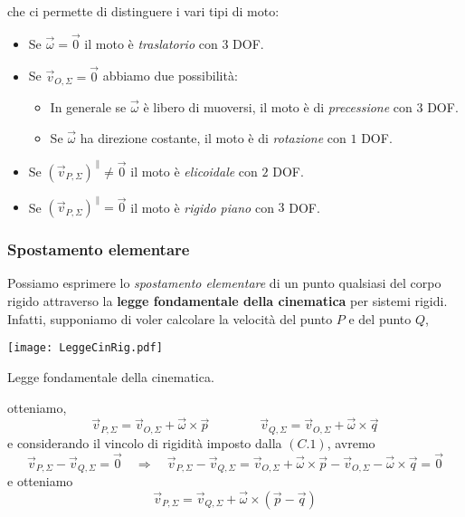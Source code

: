 che ci permette di distinguere i vari tipi di moto:
\begin{itemize}
	\item Se $\vec{\omega} = \vec{0}$ il moto è \emph{traslatorio} con $3$ DOF.
	\item Se $\vec{v}_{O,\Sigma} = \vec{0}$ abbiamo due possibilità:
	\begin{itemize}
		\item In generale se $\vec{\omega}$ è libero di muoversi, il moto è di \emph{precessione} con $3$ DOF.
		\item Se $\vec{\omega}$ ha direzione costante, il moto è di \emph{rotazione} con $1$ DOF.
	\end{itemize}		
	\item Se $(\vec{v}_{P,\Sigma})^{\,\parallel} \neq \vec{0}$ il moto è \emph{elicoidale} con $2$ DOF.
	\item Se $(\vec{v}_{P,\Sigma})^{\,\parallel} = \vec{0}$ il moto è \emph{rigido piano} con $3$ DOF.
\end{itemize}

\subsubsection{Spostamento elementare}
Possiamo esprimere lo \emph{spostamento elementare} di un punto qualsiasi del corpo rigido attraverso la \textbf{legge fondamentale della cinematica} per sistemi rigidi. Infatti, supponiamo di voler calcolare la velocità del punto $P$ e del punto $Q$,
\begin{center}
	\texttt{[image: LeggeCinRig.pdf]}
	\caption{Legge fondamentale della cinematica.}
\end{center}
otteniamo, 
\begin{equation}
	\vec{v}_{P,\Sigma} = \vec{v}_{O, \Sigma} + \vec{\omega} \times \vec{p} 
	\qquad \qquad
	\vec{v}_{Q,\Sigma} = \vec{v}_{O, \Sigma} + \vec{\omega} \times \vec{q} 
\end{equation}
e considerando il vincolo di rigidità imposto dalla $(C.1)$, avremo
\begin{equation*}
	\vec{v}_{P,\Sigma} - \vec{v}_{Q,\Sigma} = \vec{0} \quad \Rightarrow \quad \vec{v}_{P,\Sigma} - \vec{v}_{Q,\Sigma} = \vec{v}_{O, \Sigma} + \vec{\omega} \times \vec{p} - \vec{v}_{O, \Sigma} - \vec{\omega} \times \vec{q} = \vec{0}
\end{equation*}
e otteniamo 
\begin{equation}
	\vec{v}_{P,\Sigma} = \vec{v}_{Q,\Sigma} + \vec{\omega} \times (\vec{p} - \vec{q})
\end{equation}

